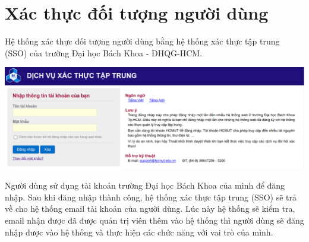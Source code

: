 \section{Xác thực đối tượng người dùng}
Hệ thống xác thực đối tượng người dùng bằng hệ thống xác thực tập trung (SSO) của trường Đại học Bách Khoa - ĐHQG-HCM.
\begin{center}
  \captionsetup{type=figure}
  \includegraphics[width=15cm]{img/Screen/sso.png}
\end{center}

Người dùng sử dụng tài khoản trường Đại học Bách Khoa của mình để đăng nhập. Sau khi đăng nhập thành công, hệ thống xác thực tập trung (SSO) sẽ trả về cho hệ thống email tài khoản của người dùng. Lúc này hệ thống sẽ kiểm tra, email nhận được đã được quản trị viên thêm vào hệ thống thì người dùng sẽ đăng nhập được vào hệ thống và thực hiện các chức năng với vai trò của mình.\\

